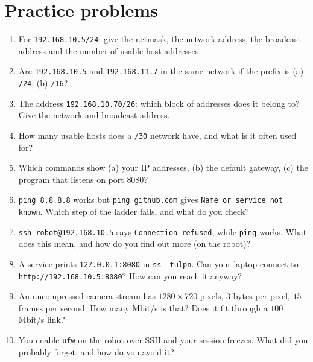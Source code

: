 \section*{Practice problems}
\begin{enumerate}[label=\textbf{\thechapter.\arabic*}]
  \item For \texttt{192.168.10.5/24}: give the netmask, the network address, the broadcast address and the number of usable host addresses.
  \item Are \texttt{192.168.10.5} and \texttt{192.168.11.7} in the same network if the prefix is (a) \texttt{/24}, (b) \texttt{/16}?
  \item The address \texttt{192.168.10.70/26}: which block of addresses does it belong to? Give the network and broadcast address.
  \item How many usable hosts does a \texttt{/30} network have, and what is it often used for?
  \item Which commands show (a) your IP addresses, (b) the default gateway, (c) the program that listens on port $8080$?
  \item \texttt{ping 8.8.8.8} works but \texttt{ping github.com} gives \texttt{Name or service not known}. Which step of the ladder fails, and what do you check?
  \item \texttt{ssh robot@192.168.10.5} says \texttt{Connection refused}, while \texttt{ping} works. What does this mean, and how do you find out more (on the robot)?
  \item A service prints \verb|127.0.0.1:8080| in \texttt{ss -tulpn}. Can your laptop connect to \texttt{http://192.168.10.5:8080}? How can you reach it anyway?
  \item An uncompressed camera stream has $1280\times720$ pixels, $3$ bytes per pixel, $15$ frames per second. How many Mbit/s is that? Does it fit through a $100$\,Mbit/s link?
  \item[\textbf{\thechapter.10}$\star$] You enable \texttt{ufw} on the robot over SSH and your session freezes. What did you probably forget, and how do you avoid it?
\end{enumerate}

